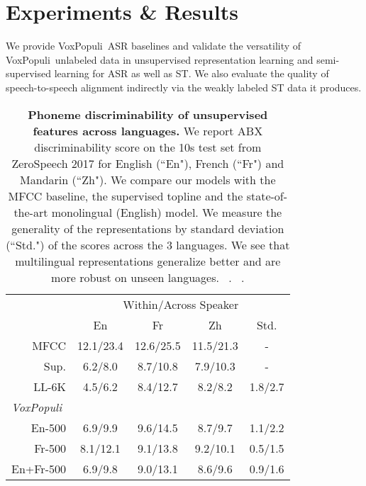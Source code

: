 \documentclass[11pt,a4paper]{article}
\newcommand{\vp}{VoxPopuli}
\begin{document}
\section{Experiments \& Results}
\label{sec:experiments_and_results}
We provide \vp~ASR baselines and validate the versatility of \vp~unlabeled data in unsupervised representation learning and semi-supervised learning for ASR as well as ST. We also evaluate the quality of speech-to-speech alignment indirectly via the weakly labeled ST data it produces.

\begin{table}[t]
    \centering
    \small
    \tabcolsep=0.16cm
    \begin{tabular}{r|c|c|c|c}
    \toprule
    & \multicolumn{4}{c}{Within/Across Speaker } \\
    & En & Fr & Zh & Std.  \\
    \midrule
    MFCC & 12.1/23.4 & 12.6/25.5 & 11.5/21.3 & - \\
    Sup. & 6.2/8.0 & 8.7/10.8 & 7.9/10.3 & - \\
    LL-6K & 4.5/6.2 & 8.4/12.7 & 8.2/8.2 & 1.8/2.7 \\
    \midrule
\multicolumn{5}{l}{\textit{\vp}} \\
    \midrule
En-500 & 6.9/9.9 & 9.6/14.5 & 8.7/9.7 & 1.1/2.2 \\
Fr-500 & 8.1/12.1 & 9.1/13.8 & 9.2/10.1 &  0.5/1.5 \\
    En+Fr-500 & 6.9/9.8 & 9.0/13.1 & 8.6/9.6 & 0.9/1.6 \\
    \bottomrule
    \end{tabular}
    \caption{\textbf{Phoneme discriminability of unsupervised features across languages.} We report ABX discriminability score on the 10s test set from ZeroSpeech 2017 for English (``En"), French (``Fr") and Mandarin (``Zh"). We compare our models with the MFCC baseline, the supervised topline and the state-of-the-art monolingual (English) model. We measure the generality of the representations by standard deviation (``Std.") of the scores across the 3 languages. We see that multilingual representations generalize better and are more robust on unseen languages. ~\citet{dunbar2017zero}. ~\citet{riviere2020unsupervised_wild}.}
    \label{tab:zerospeech17}
\end{table}
\end{document}
